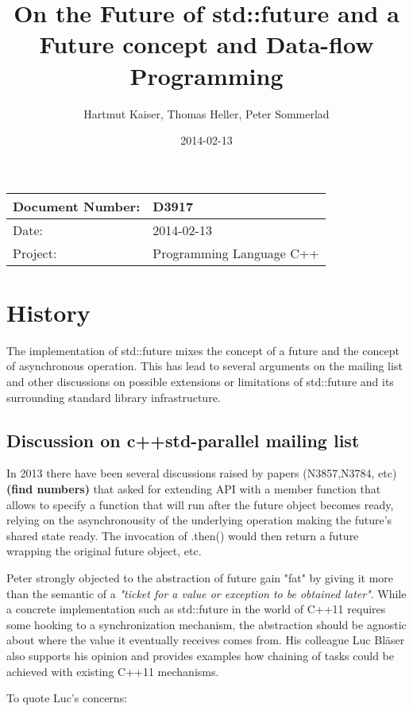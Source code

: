 \documentclass[ebook,11pt,article]{memoir}
\title{On the Future of std::future and a Future concept and Data-flow Programming}
\author{Hartmut Kaiser, Thomas Heller, Peter Sommerlad}
\date{2014-02-13}                                           %
\begin{document}
\maketitle
\begin{tabular}[t]{|l|l|}\hline 
Document Number: & D3917 \\\hline
Date: & 2014-02-13 \\\hline
Project: & Programming Language C++\\\hline 
\end{tabular}
\chapter{History}
The implementation of std::future mixes the concept of a future and the concept of asynchronous operation. This has lead to several arguments on the mailing list and other discussions on possible extensions or limitations of std::future and its surrounding standard library infrastructure.

\section{Discussion on c++std-parallel mailing list}

In 2013 there have been several discussions raised by papers (N3857,N3784, etc) \textbf{(find numbers)} that asked for extending  API with a member function  that allows to specify a function that will run after the future object becomes ready, relying on the asynchronousity of the underlying operation making the future's shared state ready. The invocation of .then() would then return a future wrapping the original future object, etc. 

Peter strongly objected to the abstraction of future gain "fat" by giving it more than the semantic of a \emph{"ticket for a value or exception to be obtained later"}. While a concrete implementation such as std::future in the world of C++11 requires some hooking to a synchronization mechanism, the abstraction should be agnostic about where the value it eventually receives comes from. His colleague Luc Bläser also supports his opinion and provides examples how chaining of tasks could be achieved with existing C++11 mechanisms.

To quote Luc's concerns:
\end{document}

